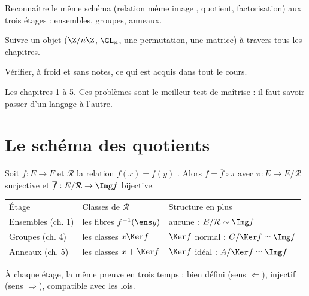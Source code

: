 \begin{objectifs}
\item Reconnaître le même schéma (relation \og même image \fg, quotient, factorisation) aux trois étages : ensembles, groupes, anneaux.
\item Suivre un objet ($\Z/n\Z$, $\GL_n$, une permutation, une matrice) à travers tous les chapitres.
\item Vérifier, à froid et sans notes, ce qui est acquis dans tout le cours.
\end{objectifs}
\begin{prerequis}
Les chapitres 1 à 5. Ces problèmes sont le meilleur test de maîtrise : il faut savoir passer d'un langage à l'autre.
\end{prerequis}

\section{Le schéma des quotients}
\begin{essentiel}
Soit $f:E\to F$ et $\mathcal R$ la relation \og $f(x)=f(y)$ \fg. Alors $f=\overline f\circ\pi$ avec $\pi:E\to E/\mathcal R$ surjective et $\overline f:E/\mathcal R\to\Img f$ bijective.
\begin{tabular}{lll}
Étage & Classes de $\mathcal R$ & Structure en plus \\
Ensembles (ch. 1) & les fibres $f^{-1}(\ens y)$ & aucune : $E/\mathcal R\sim\Img f$ \\
Groupes (ch. 4) & les classes $x\Ker f$ & $\Ker f$ normal : $G/\Ker f\simeq\Img f$ \\
Anneaux (ch. 5) & les classes $x+\Ker f$ & $\Ker f$ idéal : $A/\Ker f\simeq\Img f$ \\
\end{tabular}
À chaque étage, la même preuve en trois temps : bien défini (sens $\Leftarrow$), injectif (sens $\Rightarrow$), compatible avec les lois.
\end{essentiel}

